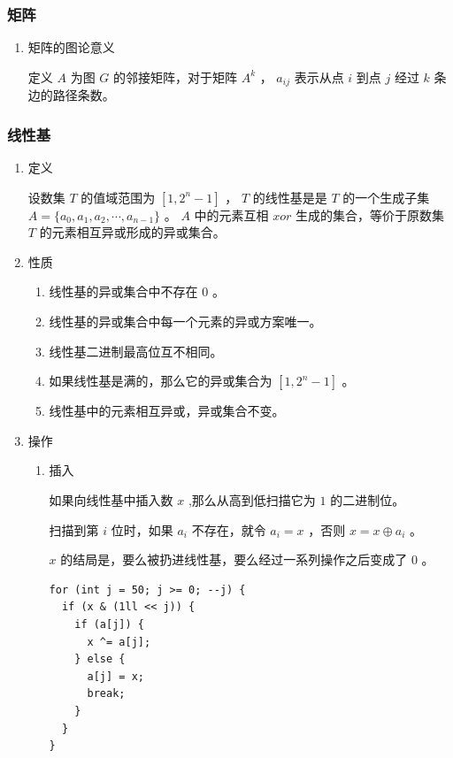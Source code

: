 \documentclass[11pt]{article}
\begin{document}
\subsubsection{矩阵}
\label{sec-3-1-1}

\begin{enumerate}
\item 矩阵的图论意义
\label{sec-3-1-1-1}

定义 $A$ 为图 $G$ 的邻接矩阵，对于矩阵 $A^k$ ， $a_{ij}$ 表示从点 $i$ 到点 $j$ 经过 $k$ 条边的路径条数。
\end{enumerate}
\subsubsection{线性基}
\label{sec-3-1-2}

\begin{enumerate}
\item 定义
\label{sec-3-1-2-1}

设数集 $T$ 的值域范围为 $[1,2^n-1]$ ， $T$ 的线性基是是 $T$ 的一个生成子集 $A=\{a_0,a_1,a_2,\cdots,a_{n-1}\}$ 。 $A$ 中的元素互相 $xor$ 生成的集合，等价于原数集 $T$ 的元素相互异或形成的异或集合。

\item 性质
\label{sec-3-1-2-2}

\begin{enumerate}
\item 线性基的异或集合中不存在 $0$ 。
\item 线性基的异或集合中每一个元素的异或方案唯一。
\item 线性基二进制最高位互不相同。
\item 如果线性基是满的，那么它的异或集合为 $[1,2^n-1]$ 。
\item 线性基中的元素相互异或，异或集合不变。
\end{enumerate}

\item 操作
\label{sec-3-1-2-3}

\begin{enumerate}
\item 插入
\label{sec-3-1-2-3-1}

如果向线性基中插入数 $x$ ,那么从高到低扫描它为 $1$ 的二进制位。

扫描到第 $i$ 位时，如果 $a_i$ 不存在，就令 $a_i=x$ ，否则 $x=x \oplus a_i$ 。

$x$ 的结局是，要么被扔进线性基，要么经过一系列操作之后变成了 $0$ 。

\begin{verbatim}
for (int j = 50; j >= 0; --j) {
  if (x & (1ll << j)) {
    if (a[j]) {
      x ^= a[j];
    } else {
      a[j] = x;
      break;
    }
  }
}
\end{verbatim}


\end{enumerate}
\end{enumerate}
\end{document}
